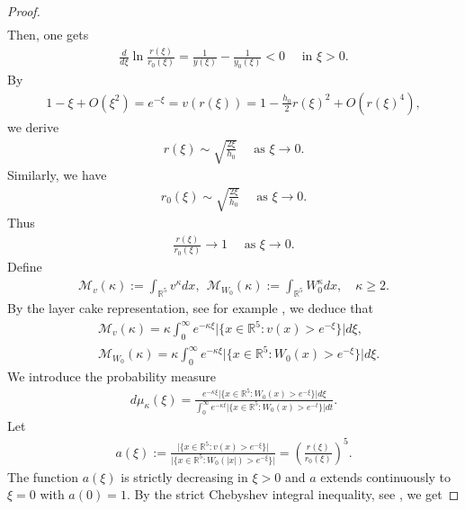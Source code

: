 \documentclass{article}
\theoremstyle{definition} \theoremstyle{remark}
\numberwithin{equation}{section}
\newcommand{\R}{\mathbb{R}}
\begin{document}
\begin{proof}
\begin{align*}
		\end{align*}
		Then, one gets
		\begin{align*}
			\frac{d}{d\xi} \ln \frac{r(\xi)}{r_0(\xi)} = \frac{1}{y(\xi)} - \frac{1}{y_0(\xi)} < 0 \quad \text{ in } \xi > 0.
		\end{align*}
		By
		\begin{align*}
			1 - \xi + O(\xi^2) = e^{-\xi} = v(r(\xi)) = 1 - \frac{h_0}{2}r(\xi)^2 + O(r(\xi)^4),
		\end{align*}
		we derive
		\begin{align*}
			r(\xi) \sim \sqrt{\frac{2\xi}{h_0}} \quad \text{ as } \xi \to 0.
		\end{align*}
		Similarly, we have
		\begin{align*}
			r_0(\xi) \sim \sqrt{\frac{2\xi}{h_0}} \quad \text{ as } \xi \to 0.
		\end{align*}
		Thus
		\begin{align*}
			\frac{r(\xi)}{r_0(\xi)} \to 1 \quad \text{ as } \xi \to 0.
		\end{align*}
Define
		\begin{align*}
			\mathcal{M}_{v}(\kappa) := \int_{\R^5}v^\kappa dx, ~~ \mathcal{M}_{W_0}(\kappa) := \int_{\R^5}W_0^\kappa dx, \quad \kappa \ge 2.
		\end{align*}
		By the layer cake representation, see for example \cite{LL}, we deduce that
		\begin{align*}
			& \mathcal{M}_{v}(\kappa) = \kappa\int_0^\infty e^{-\kappa\xi}\big|\big\{x \in \R^5: v(x) > e^{-\xi} \big\}\big|d\xi, \\
			& \mathcal{M}_{W_0}(\kappa) = \kappa\int_0^\infty e^{-\kappa\xi}\big|\big\{x \in \R^5: W_0(x) > e^{-\xi} \big\}\big|d\xi.
		\end{align*}
		We introduce the probability measure
		\begin{align*}
			d\mu_\kappa(\xi) = \frac{e^{-\kappa\xi}\big|\big\{x \in \R^5: W_0(x) > e^{-\xi} \big\}\big|d\xi}{\int_0^\infty e^{-\kappa t}\big|\big\{x \in \R^5: W_0(x) > e^{-t} \big\}\big|dt}.
		\end{align*}
		Let
		\begin{align*}
			a(\xi) := \frac{\big|\big\{x \in \R^5: v(x) > e^{-\xi} \big\}\big|}{\big|\big\{x \in \R^5: W_0(|x|) > e^{-\xi} \big\}\big|} = \left(\frac{r(\xi)}{r_0(\xi)}\right)^5.
		\end{align*}
		The function $a(\xi)$ is strictly decreasing in $\xi > 0$ and $a$ extends continuously to $\xi = 0$ with $a(0) = 1$. By the strict Chebyshev integral inequality, see \cite{Jak}, we get

\end{proof}
\end{document}
